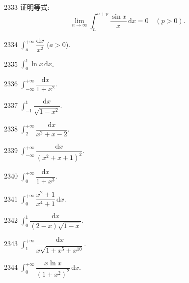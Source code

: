 \begin{prob}[M]{2333}
证明等式:
\[
\lim_{n\to\infty} \int_{n}^{n+p} \frac{\sin x}{x}\,\mathrm{d}x = 0 \quad (p > 0).
\]
\end{prob}



\begin{prob}[S]{2334}
$\int_{a}^{+\infty} \dfrac{\mathrm{d}x}{x^2}$ ($a > 0$).
\end{prob}

\begin{prob}[S]{2335}
$\int_{0}^{1} \ln x\,\mathrm{d}x$.
\end{prob}

\begin{prob}[S]{2336}
$\int_{-\infty}^{+\infty} \dfrac{\mathrm{d}x}{1 + x^2}$.
\end{prob}

\begin{prob}[S]{2337}
$\int_{-1}^{1} \dfrac{\mathrm{d}x}{\sqrt{1 - x^2}}$.
\end{prob}

\begin{prob}[S]{2338}
$\int_{2}^{+\infty} \dfrac{\mathrm{d}x}{x^2 + x - 2}$.
\end{prob}

\begin{prob}[S]{2339}
$\int_{-\infty}^{+\infty} \dfrac{\mathrm{d}x}{(x^2 + x + 1)^2}$.
\end{prob}

\begin{prob}[S]{2340}
$\int_{0}^{+\infty} \dfrac{\mathrm{d}x}{1 + x^3}$.
\end{prob}

\begin{prob}[S]{2341}
$\int_{0}^{+\infty} \dfrac{x^2 + 1}{x^4 + 1}\,\mathrm{d}x$.
\end{prob}

\begin{prob}[S]{2342}
$\int_{0}^{1} \dfrac{\mathrm{d}x}{(2 - x)\sqrt{1 - x}}$.
\end{prob}

\begin{prob}[S]{2343}
$\int_{1}^{+\infty} \dfrac{\mathrm{d}x}{x\sqrt{1 + x^5 + x^{10}}}$.
\end{prob}

\begin{prob}[S]{2344}
$\int_{0}^{+\infty} \dfrac{x\ln x}{(1 + x^2)^2}\,\mathrm{d}x$.
\end{prob}

